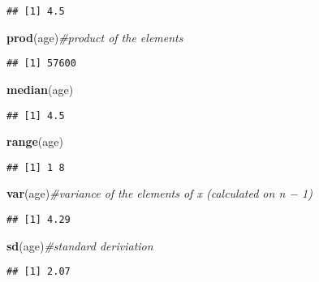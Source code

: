 \documentclass[]{book}
\newenvironment{Shaded}{\begin{snugshade}}{\end{snugshade}}
\newcommand{\KeywordTok}[1]{\textcolor[rgb]{0.13,0.29,0.53}{\textbf{#1}}}
\newcommand{\CommentTok}[1]{\textcolor[rgb]{0.56,0.35,0.01}{\textit{#1}}}
\newcommand{\NormalTok}[1]{#1}
\theoremstyle{definition}
\theoremstyle{definition}
\theoremstyle{definition}
\theoremstyle{remark}
\begin{document}
\begin{verbatim}
## [1] 4.5
\end{verbatim}

\begin{Shaded}
\begin{Highlighting}[]
\KeywordTok{prod}\NormalTok{(age)}\CommentTok{#product of the elements }
\end{Highlighting}
\end{Shaded}

\begin{verbatim}
## [1] 57600
\end{verbatim}

\begin{Shaded}
\begin{Highlighting}[]
\KeywordTok{median}\NormalTok{(age)}
\end{Highlighting}
\end{Shaded}

\begin{verbatim}
## [1] 4.5
\end{verbatim}

\begin{Shaded}
\begin{Highlighting}[]
\KeywordTok{range}\NormalTok{(age)}
\end{Highlighting}
\end{Shaded}

\begin{verbatim}
## [1] 1 8
\end{verbatim}

\begin{Shaded}
\begin{Highlighting}[]
\KeywordTok{var}\NormalTok{(age)}\CommentTok{#variance of the elements of x (calculated on n − 1)}
\end{Highlighting}
\end{Shaded}

\begin{verbatim}
## [1] 4.29
\end{verbatim}

\begin{Shaded}
\begin{Highlighting}[]
\KeywordTok{sd}\NormalTok{(age)}\CommentTok{#standard deriviation}
\end{Highlighting}
\end{Shaded}

\begin{verbatim}
## [1] 2.07
\end{verbatim}
\end{document}
